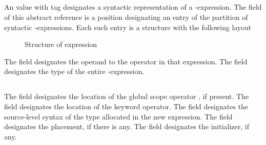 


\subsection{}
\label{sec:ifc:ExprSort:Alignof}

An  value with tag  designates a syntactic representation
of a -expression.
The  field of this abstract reference is a position designating an entry of the partition
of syntactic -expressions.  Each such entry is a structure with the following layout
%
\begin{figure}[H]
	\centering
	\caption{Structure of  expression}
	\label{fig:ifc:ExprSort:Alignof}
\end{figure}

The  field designates the operand to the  operator in that expression.
The  field designates the type of the entire -expression.




\subsection{}
\label{sec:ifc:ExprSort:New}

\begin{figure}[H]
	\centering
\end{figure}

The field  designates the location of the global scope operator \code{::}, if present.
The field  designates the location of the  keyword operator.
The field  designates the source-level syntax of the type allocated in the new expression.
The field  designates the placement, if there is any.
The field  designates the initializer, if any.

